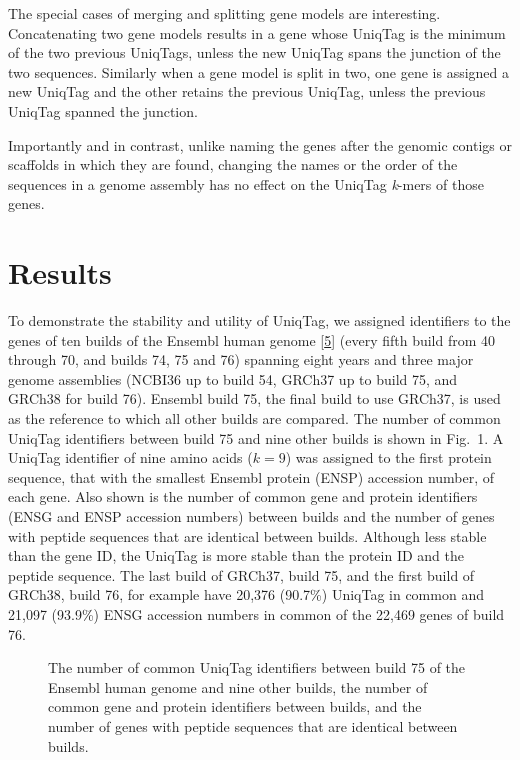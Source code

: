 \documentclass[10pt]{article}
\begin{document}
The special cases of merging and splitting gene models are interesting.
Concatenating two gene models results in a gene whose UniqTag is the
minimum of the two previous UniqTags, unless the new UniqTag spans the
junction of the two sequences. Similarly when a gene model is split in
two, one gene is assigned a new UniqTag and the other retains the
previous UniqTag, unless the previous UniqTag spanned the junction.

Importantly and in contrast, unlike naming the genes after the genomic
contigs or scaffolds in which they are found, changing the names or the
order of the sequences in a genome assembly has no effect on the UniqTag
\emph{k}-mers of those genes.

\section{Results}\label{results}

To demonstrate the stability and utility of UniqTag, we assigned
identifiers to the genes of ten builds of the Ensembl human genome
{[}\href{http://dx.doi.org/10.1093/nar/gku1010}{5}{]} (every fifth build
from 40 through 70, and builds 74, 75 and 76) spanning eight years and
three major genome assemblies (NCBI36 up to build 54, GRCh37 up to build
75, and GRCh38 for build 76). Ensembl build 75, the final build to use
GRCh37, is used as the reference to which all other builds are compared.
The number of common UniqTag identifiers between build 75 and nine other
builds is shown in Fig.~1. A UniqTag identifier of nine amino acids
(\(k=9\)) was assigned to the first protein sequence, that with the
smallest Ensembl protein (ENSP) accession number, of each gene. Also
shown is the number of common gene and protein identifiers (ENSG and
ENSP accession numbers) between builds and the number of genes with
peptide sequences that are identical between builds. Although less
stable than the gene ID, the UniqTag is more stable than the protein ID
and the peptide sequence. The last build of GRCh37, build 75, and the
first build of GRCh38, build 76, for example have 20,376 (90.7\%)
UniqTag in common and 21,097 (93.9\%) ENSG accession numbers in common
of the 22,469 genes of build 76.

\begin{figure}[htbp]
\centering
\caption{The number of common UniqTag identifiers between build 75 of
the Ensembl human genome and nine other builds, the number of common
gene and protein identifiers between builds, and the number of genes
with peptide sequences that are identical between builds.}
\end{figure}
\end{document}
